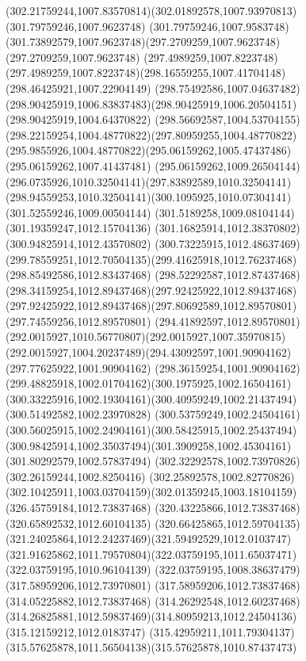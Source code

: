 {{\curveto(302.21759244,1007.83570814)(302.01892578,1007.93970813)(301.79759246,1007.9623748)
\lineto(301.79759246,1007.9583748)
\curveto(301.73892579,1007.9623748)(297.2709259,1007.9623748)(297.2709259,1007.9623748)
\lineto(297.4989259,1007.8223748)
\curveto(297.4989259,1007.8223748)(298.16559255,1007.41704148)(298.46425921,1007.22904149)
\curveto(298.75492586,1007.04637482)(298.90425919,1006.83837483)(298.90425919,1006.20504151)
\lineto(298.90425919,1004.64370822)
\curveto(298.56692587,1004.53704155)(298.22159254,1004.48770822)(297.80959255,1004.48770822)
\curveto(295.9855926,1004.48770822)(295.06159262,1005.47437486)(295.06159262,1007.41437481)
\curveto(295.06159262,1009.26504144)(296.0735926,1010.32504141)(297.83892589,1010.32504141)
\curveto(298.94559253,1010.32504141)(300.1095925,1010.07304141)(301.52559246,1009.00504144)
\lineto(301.5189258,1009.08104144)
\lineto(301.19359247,1012.15704136)
\lineto(301.16825914,1012.38370802)
\lineto(300.94825914,1012.43570802)
\lineto(300.73225915,1012.48637469)
\curveto(299.78559251,1012.70504135)(299.41625918,1012.76237468)(298.85492586,1012.83437468)
\curveto(298.52292587,1012.87437468)(298.34159254,1012.89437468)(297.92425922,1012.89437468)
\curveto(297.92425922,1012.89437468)(297.80692589,1012.89570801)(297.74559256,1012.89570801)
\curveto(294.41892597,1012.89570801)(292.0015927,1010.56770807)(292.0015927,1007.35970815)
\curveto(292.0015927,1004.20237489)(294.43092597,1001.90904162)(297.77625922,1001.90904162)
\curveto(298.36159254,1001.90904162)(299.48825918,1002.01704162)(300.1975925,1002.16504161)
\curveto(300.33225916,1002.19304161)(300.40959249,1002.21437494)(300.51492582,1002.23970828)
\curveto(300.53759249,1002.24504161)(300.56025915,1002.24904161)(300.58425915,1002.25437494)
\curveto(300.98425914,1002.35037494)(301.3909258,1002.45304161)(301.80292579,1002.57837494)
\lineto(302.32292578,1002.73970826)
\lineto(302.26159244,1002.8250416)
\curveto(302.25892578,1002.82770826)(302.10425911,1003.03704159)(302.01359245,1003.18104159)
\moveto(326.45759184,1012.73837468)
\lineto(320.43225866,1012.73837468)
\lineto(320.65892532,1012.60104135)
\curveto(320.66425865,1012.59704135)(321.24025864,1012.24237469)(321.59492529,1012.0103747)
\curveto(321.91625862,1011.79570804)(322.03759195,1011.65037471)(322.03759195,1010.96104139)
\lineto(322.03759195,1008.38637479)
\lineto(317.58959206,1012.73970801)
\lineto(317.58959206,1012.73837468)
\lineto(314.05225882,1012.73837468)
\lineto(314.26292548,1012.60237468)
\curveto(314.26825881,1012.59837469)(314.80959213,1012.24504136)(315.12159212,1012.0183747)
\curveto(315.42959211,1011.79304137)(315.57625878,1011.56504138)(315.57625878,1010.87437473)
}}
